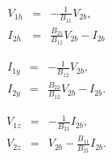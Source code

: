 \documentclass[a4paper, 12pt]{article}
\begin{document}
\begin{eqnarray}
  V_{1h} & = & -\frac{1}{B_{11}} V_{2b}, \\
  I_{2h} & = & \frac{B_{21}}{B_{11}} V_{2b} - I_{2b}
\end{eqnarray}

%
\begin{eqnarray}
  I_{1y} & = & -\frac{1}{B_{12}} V_{2b}, \\
  I_{2y} & = & \frac{B_{22}}{B_{12}} V_{2b} - I_{2b}.
\end{eqnarray}

%
\begin{eqnarray}
V_{1z} & = & -\frac{1}{B_{21}} I_{2b}, \\
V_{2z} & = & V_{2b} -\frac{B_{11}}{B_{21}} I_{2b}.
\end{eqnarray}
\end{document}
